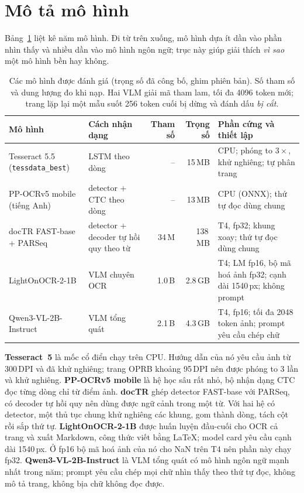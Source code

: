 \documentclass[10pt,a4paper]{article}
\begin{document}
\section{Mô tả mô hình}
Bảng~\ref{tab:models} liệt kê năm mô hình. Đi từ trên xuống, mô hình dựa ít dần vào phần nhìn thấy và nhiều
dần vào mô hình ngôn ngữ; trục này giúp giải thích \emph{vì sao} một mô hình bền hay không.

\begin{table}[h]
\centering\small
\caption{Các mô hình được đánh giá (trọng số đã công bố, ghim phiên bản). Số tham số và dung lượng đo khi nạp.
Hai VLM giải mã tham lam, tối đa 4096 token mới; trang lặp lại một mẫu suốt 256 token cuối bị dừng và đánh dấu
\emph{bị cắt}.}
\label{tab:models}
\begin{tabularx}{\textwidth}{@{}llrrX@{}}
\toprule
Mô hình & Cách nhận dạng & Tham số & Trọng số & Phần cứng và thiết lập \\
\midrule
Tesseract 5.5 (\texttt{tessdata\_best}) & LSTM theo dòng & -- & 15\,MB & CPU; phóng to $3\times$, khử nghiêng; tự phân trang \\
PP-OCRv5 mobile (tiếng Anh) & detector + CTC theo dòng & -- & 13\,MB & CPU (ONNX); thứ tự đọc dùng chung \\
docTR FAST-base + PARSeq & detector + decoder tự hồi quy theo từ & 34\,M & 138\,MB & T4, fp32; khung xoay; thứ tự đọc dùng chung \\
LightOnOCR-2-1B & VLM chuyên OCR & 1.0\,B & 2.8\,GB & T4; LM fp16, bộ mã hoá ảnh fp32; cạnh dài 1540\,px; không prompt \\
Qwen3-VL-2B-Instruct & VLM tổng quát & 2.1\,B & 4.3\,GB & T4, fp16; tối đa 2048 token ảnh; prompt yêu cầu chép chữ \\
\bottomrule
\end{tabularx}
\end{table}

\textbf{Tesseract~5} là mốc cổ điển chạy trên CPU. Hướng dẫn của nó yêu cầu ảnh từ 300\,DPI và đã khử nghiêng;
trang OPRB khoảng 95\,DPI nên được phóng to 3 lần và khử nghiêng. \textbf{PP-OCRv5 mobile} là hệ học sâu rất nhỏ,
bộ nhận dạng CTC đọc từng dòng chỉ từ điểm ảnh. \textbf{docTR} ghép detector FAST-base với PARSeq, có decoder tự
hồi quy nên dùng được ngữ cảnh trong một từ. Với hai hệ có detector, một thủ tục chung khử nghiêng các khung,
gom thành dòng, tách cột rồi sắp thứ tự. \textbf{LightOnOCR-2-1B} được huấn luyện đầu-cuối cho OCR cả trang và
xuất Markdown, công thức viết bằng LaTeX; model card yêu cầu cạnh dài 1540\,px. Ở fp16 bộ mã hoá ảnh của nó cho
NaN trên T4 nên phần này chạy fp32. \textbf{Qwen3-VL-2B-Instruct} là VLM tổng quát có mô hình ngôn ngữ mạnh nhất
trong năm; prompt yêu cầu chép mọi chữ nhìn thấy theo thứ tự đọc, không mô tả trang, không bịa chữ không đọc được.
\end{document}
